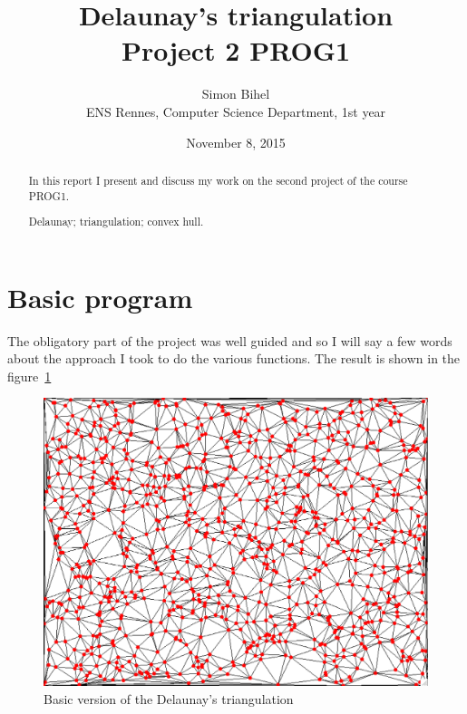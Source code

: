 \documentclass[a4paper,11pt]{article}%
\newenvironment{keywords}%
{\description\item[Keyword.]}%
{\enddescription}
\begin{document}
\title{Delaunay's triangulation \\ Project 2 PROG1}

\author{Simon Bihel \\ ENS Rennes, Computer Science Department, 1st year}

\date{November 8, 2015}

\maketitle

\begin{abstract}
	In this report I present and discuss my work on the second project of the course PROG1.
\begin{keywords}
	Delaunay; triangulation; convex hull.
\end{keywords}
\end{abstract}


\section{Basic program}

The obligatory part of the project was well guided and so I will say a few words about the approach I took to do the various functions. The result is shown in the figure~\ref{fig:basic} 

\begin{figure}[H]
	\begin{center}
		\includegraphics[scale=0.3]{basic.png}
	\end{center}
	\caption{Basic version of the Delaunay's triangulation}
	\label{fig:basic}
\end{figure}
\end{document}
